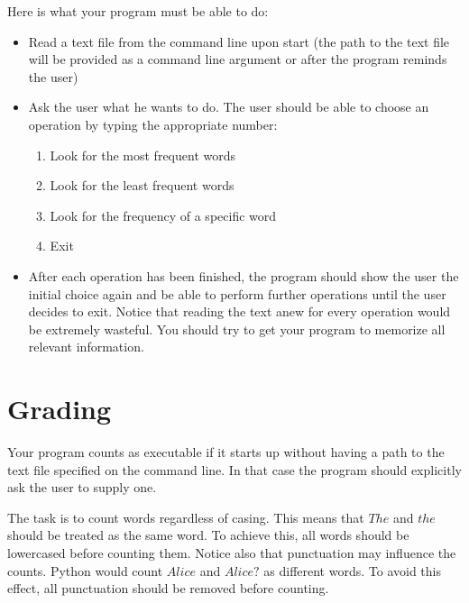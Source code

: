 \documentclass[11pt, leqno, a4paper]{article}
\begin{document}
Here is what your program must be able to do:
\begin{itemize}
\item Read a text file from the command line upon start (the path to the text file will be provided as a command line argument or after the program reminds the user)
\item Ask the user what he wants to do. The user should be able to choose an operation by typing the appropriate number:
\begin{enumerate}
\item Look for the most frequent words
\item Look for the least frequent words
\item Look for the frequency of a specific word
\item Exit
\end{enumerate}
\item After each operation has been finished, the program should show the user the initial choice again and be able to perform further operations until the
user decides to exit. Notice that reading the text anew for every operation would be extremely wasteful. You should try to get your program to memorize all
relevant information.
\end{itemize}

\section{Grading}
Your program counts as executable if it starts up without having a path to the text file specified on the command line. In that case the program should
explicitly ask the user to supply one. 

The task is to count words regardless of casing. This means that $ The $ and $ the $ should be treated as the same word. To achieve this, all words should be lowercased before counting them. Notice also that 
punctuation may influence the counts. Python would count $ Alice $ and $ Alice? $ as different words.
To avoid this effect, all punctuation should be removed before counting.
\end{document}
